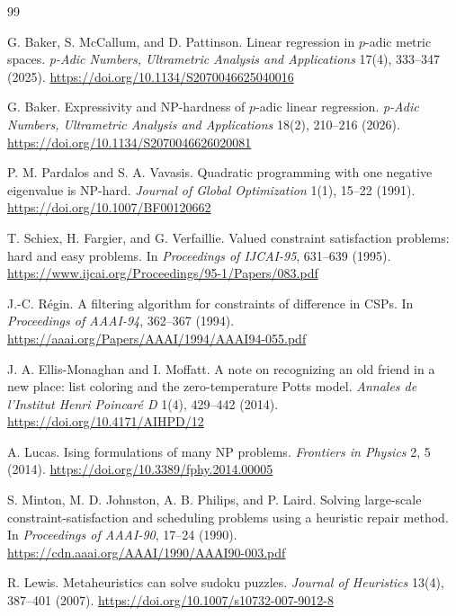 \documentclass[11pt]{article}
\begin{document}
\begin{thebibliography}{99}

G. Baker, S. McCallum, and D. Pattinson.
\newblock Linear regression in \(p\)-adic metric spaces.
\newblock \emph{p-Adic Numbers, Ultrametric Analysis and Applications} 17(4), 333--347 (2025).
\newblock \url{https://doi.org/10.1134/S2070046625040016}

G. Baker.
\newblock Expressivity and NP-hardness of \(p\)-adic linear regression.
\newblock \emph{p-Adic Numbers, Ultrametric Analysis and Applications} 18(2), 210--216 (2026).
\newblock \url{https://doi.org/10.1134/S2070046626020081}

P. M. Pardalos and S. A. Vavasis.
\newblock Quadratic programming with one negative eigenvalue is NP-hard.
\newblock \emph{Journal of Global Optimization} 1(1), 15--22 (1991).
\newblock \url{https://doi.org/10.1007/BF00120662}

T. Schiex, H. Fargier, and G. Verfaillie.
\newblock Valued constraint satisfaction problems: hard and easy problems.
\newblock In \emph{Proceedings of IJCAI-95}, 631--639 (1995).
\newblock \url{https://www.ijcai.org/Proceedings/95-1/Papers/083.pdf}

J.-C. R\'egin.
\newblock A filtering algorithm for constraints of difference in CSPs.
\newblock In \emph{Proceedings of AAAI-94}, 362--367 (1994).
\newblock \url{https://aaai.org/Papers/AAAI/1994/AAAI94-055.pdf}

J. A. Ellis-Monaghan and I. Moffatt.
\newblock A note on recognizing an old friend in a new place: list coloring and the zero-temperature Potts model.
\newblock \emph{Annales de l'Institut Henri Poincar\'e D} 1(4), 429--442 (2014).
\newblock \url{https://doi.org/10.4171/AIHPD/12}

A. Lucas.
\newblock Ising formulations of many NP problems.
\newblock \emph{Frontiers in Physics} 2, 5 (2014).
\newblock \url{https://doi.org/10.3389/fphy.2014.00005}

S. Minton, M. D. Johnston, A. B. Philips, and P. Laird.
\newblock Solving large-scale constraint-satisfaction and scheduling problems using a heuristic repair method.
\newblock In \emph{Proceedings of AAAI-90}, 17--24 (1990).
\newblock \url{https://cdn.aaai.org/AAAI/1990/AAAI90-003.pdf}

R. Lewis.
\newblock Metaheuristics can solve sudoku puzzles.
\newblock \emph{Journal of Heuristics} 13(4), 387--401 (2007).
\newblock \url{https://doi.org/10.1007/s10732-007-9012-8}


\end{thebibliography}
\end{document}
